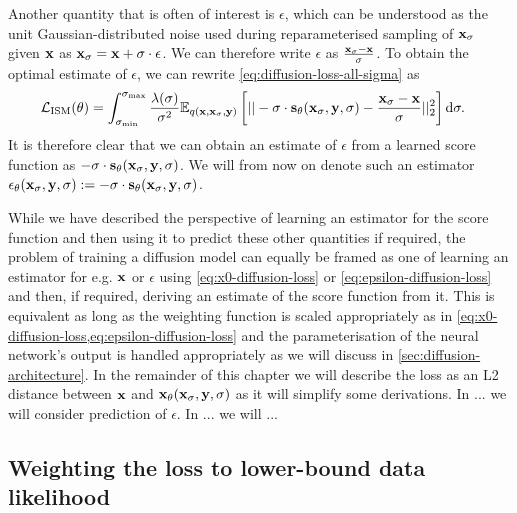 Another quantity that is often of interest is $\epsilon$, which can be understood as the unit Gaussian-distributed noise used during reparameterised sampling of ${\mathbf{x}}_\sigma$ given ${\mathbf{x}}$ as ${\mathbf{x}}_\sigma = {\mathbf{x}} + \sigma \cdot \epsilon$. We can therefore write $\epsilon$ as $\frac{{\mathbf{x}}_\sigma-{\mathbf{x}}}{\sigma}$. To obtain the optimal estimate of $\epsilon$, we can rewrite \cref{eq:diffusion-loss-all-sigma} as
\begin{align} \label{eq:epsilon-diffusion-loss}
    \mathcal{L}_\text{ISM}(\theta) &= \int_{\sigma_\text{min}}^{\sigma_\text{max}} \frac{\lambda(\sigma)}{\sigma^2} \mathbb{E}_{q({\mathbf{x}}, {\mathbf{x}}_\sigma, {\mathbf{y}})} \left[ 
    || -\sigma \cdot {\mathbf{s}}_\theta({\mathbf{x}}_\sigma, {\mathbf{y}}, \sigma) - \frac{{\mathbf{x}}_\sigma-{\mathbf{x}}}{\sigma} ||_2^2 \right] \mathrm{d}\sigma.
\end{align}
It is therefore clear that we can obtain an estimate of $\epsilon$ from a learned score function as $-\sigma \cdot {\mathbf{s}}_\theta({\mathbf{x}}_\sigma, {\mathbf{y}}, \sigma)$. We will from now on denote such an estimator $\mathbf{\epsilon}_\theta({\mathbf{x}}_\sigma, {\mathbf{y}}, \sigma) := -\sigma \cdot {\mathbf{s}}_\theta({\mathbf{x}}_\sigma, {\mathbf{y}}, \sigma)$.

While we have described the perspective of learning an estimator for the score function and then using it to predict these other quantities if required, the problem of training a diffusion model can equally be framed as one of learning an estimator for e.g. ${\mathbf{x}}$ or $\epsilon$ using \cref{eq:x0-diffusion-loss} or \cref{eq:epsilon-diffusion-loss} and then, if required, deriving an estimate of the score function from it. This is equivalent as long as the weighting function is scaled appropriately as in \cref{eq:x0-diffusion-loss,eq:epsilon-diffusion-loss} and the parameterisation of the neural network's output is handled appropriately as we will discuss in 
\cref{sec:diffusion-architecture}. In the remainder of this chapter we will describe the loss as an L2 distance between ${\mathbf{x}}$ and ${\mathbf{x}}_\theta({\mathbf{x}}_\sigma, {\mathbf{y}}, \sigma)$ as it will simplify some derivations. In ... we will consider prediction of $\epsilon$. In ... we will ...

\subsection{Weighting the loss to lower-bound data likelihood} \label{sec:diffusion-likelihood}

